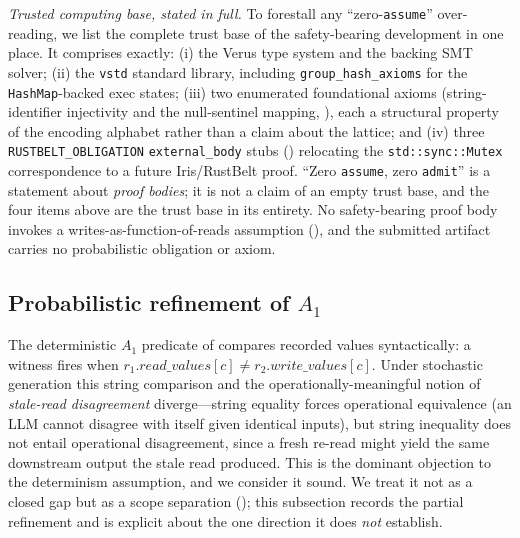 \documentclass[journal,compsoc,10pt]{IEEEtran}
\theoremstyle{definition}
\theoremstyle{remark}
\begin{document}
\smallskip
\noindent\emph{Trusted computing base, stated in full.} To forestall any
``zero-\texttt{assume}'' over-reading, we list the complete trust base of
the safety-bearing development in one place. It comprises exactly: (i) the
Verus type system and the backing SMT solver; (ii) the \texttt{vstd}
standard library, including \texttt{group\_hash\_axioms} for the
\texttt{HashMap}-backed exec states; (iii) two enumerated foundational
axioms (string-identifier injectivity and the null-sentinel mapping,
), each a structural property of the
encoding alphabet rather than a claim about the lattice; and (iv) three
\texttt{RUSTBELT\_OBLIGATION} \texttt{external\_body} stubs
() relocating the
\texttt{std::sync::Mutex} correspondence to a future Iris/RustBelt proof.
``Zero \texttt{assume}, zero \texttt{admit}'' is a statement about
\emph{proof bodies}; it is not a claim of an empty trust base, and the
four items above are the trust base in its entirety. No safety-bearing
proof body invokes a writes-as-function-of-reads assumption
(), and the submitted artifact carries no
probabilistic obligation or axiom.

\subsection{Probabilistic refinement of $A_1$}
\label{sec:probabilistic-a1}

The deterministic $A_1$ predicate of  compares recorded
values syntactically: a witness fires when
$r_1.\textit{read\_values}[c] \neq r_2.\textit{write\_values}[c]$.
Under stochastic generation this string comparison and the
operationally-meaningful notion of \emph{stale-read disagreement}
diverge---string equality forces operational equivalence (an LLM
cannot disagree with itself given identical inputs), but string
inequality does not entail operational disagreement, since a fresh
re-read might yield the same downstream output the stale read
produced. This is the dominant objection to the determinism assumption, and we
consider it sound. We treat it not as a closed gap but as
a scope separation (); this subsection
records the partial refinement and is explicit about the one direction
it does \emph{not} establish.
\end{document}

